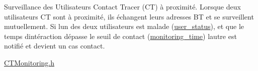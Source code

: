 Surveillance des Utilisateurs Contact Tracer (CT) à proximité. Lorsque deux utilisateurs CT sont à proximité, ils échangent leurs adresses BT et se surveillent mutuellement. Si l\textquotesingle{}un des deux utilisateurs est malade (\mbox{\hyperlink{_c_t_s_p_i_f_f_s_8h_af62606a4cab2472ff56d785a56edbac6}{user\+\_\+status}}), et que le temps d\textquotesingle{}intéraction dépasse le seuil de contact (\mbox{\hyperlink{_c_t_s_p_i_f_f_s_8h_a2e5f1885229558ed3301244352309fb7}{monitoring\+\_\+time}}) l\textquotesingle{}autre est notifié et devient un cas contact.

\mbox{\hyperlink{_c_t_monitoring_8h}{CTMonitoring.\+h}} 
